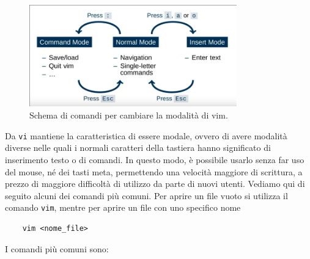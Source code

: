 \documentclass[11pt]{book}
\begin{document}
\begin{figure}
	\centering
	\includegraphics[width=0.8\textwidth]{img/vim_modes.png}
	\caption{Schema di comandi per cambiare la modalità di vim.}
	\label{vim_modes}
\end{figure}
Da \verb*|vi| mantiene la caratteristica di essere modale, ovvero di avere modalità diverse nelle quali i normali caratteri della tastiera hanno significato di inserimento testo o di comandi. In questo modo, è possibile usarlo senza far uso del mouse, né dei tasti meta, permettendo una velocità maggiore di scrittura, a prezzo di maggiore difficoltà di utilizzo da parte di nuovi utenti. Vediamo qui di seguito alcuni dei comandi più comuni. Per aprire un file vuoto si utilizza il comando \verb*|vim|, mentre per aprire un file con uno specifico nome
\begin{verbatim}
	vim <nome_file>
\end{verbatim}
 I comandi più comuni sono:
\end{document}
